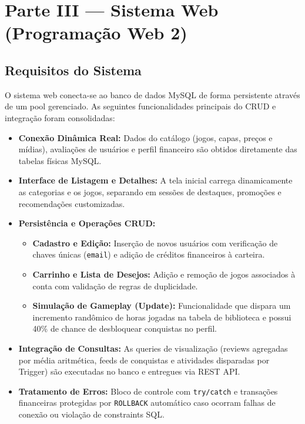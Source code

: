 \documentclass[12pt,a4paper]{article}
\begin{document}
\section{Parte III — Sistema Web (Programação Web 2)}

\subsection{Requisitos do Sistema}
O sistema web conecta-se ao banco de dados MySQL de forma persistente através de um pool gerenciado. As seguintes funcionalidades principais do CRUD e integração foram consolidadas:

\begin{itemize}
    \item \textbf{Conexão Dinâmica Real:} Dados do catálogo (jogos, capas, preços e mídias), avaliações de usuários e perfil financeiro são obtidos diretamente das tabelas físicas MySQL.
    \item \textbf{Interface de Listagem e Detalhes:} A tela inicial carrega dinamicamente as categorias e os jogos, separando em sessões de destaques, promoções e recomendações customizadas.
    \item \textbf{Persistência e Operações CRUD:}
    \begin{itemize}
        \item \textbf{Cadastro e Edição:} Inserção de novos usuários com verificação de chaves únicas (\texttt{email}) e adição de créditos financeiros à carteira.
        \item \textbf{Carrinho e Lista de Desejos:} Adição e remoção de jogos associados à conta com validação de regras de duplicidade.
        \item \textbf{Simulação de Gameplay (Update):} Funcionalidade que dispara um incremento randômico de horas jogadas na tabela de biblioteca e possui 40\% de chance de desbloquear conquistas no perfil.
    \end{itemize}
    \item \textbf{Integração de Consultas:} As queries de visualização (reviews agregadas por média aritmética, feeds de conquistas e atividades disparadas por Trigger) são executadas no banco e entregues via REST API.
    \item \textbf{Tratamento de Erros:} Bloco de controle com \texttt{try/catch} e transações financeiras protegidas por \texttt{ROLLBACK} automático caso ocorram falhas de conexão ou violação de constraints SQL.
\end{itemize}
\end{document}
